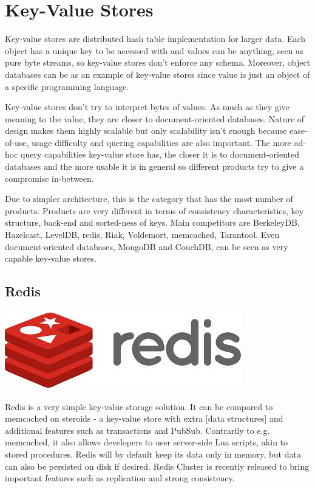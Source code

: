 \section{Key-Value Stores}

Key-value stores are distributed hash table implementation for larger data.
Each object has a unique key to be accessed with and values can be anything, seen as pure byte streams, so key-value stores don't enforce any schema.
Moreover, object databases can be as an example of key-value stores since value is just an object of a specific programming language.

Key-value stores don't try to interpret bytes of values.
As much as they give meaning to the value, they are closer to document-oriented databases.
Nature of design makes them highly scalable but only scalability isn't enough because ease-of-use, usage difficulty and quering capabilities are also important.
The more ad-hoc query capabilities key-value store has, the closer it is to document-oriented databases and the more usable it is in general so different products try to give a compromise in-between.

Due to simpler architecture, this is the category that has the most number of products.
Products are very different in terms of consistency characteristics, key structure, back-end and sorted-ness of keys. Main competitors are BerkeleyDB, Hazelcast, LevelDB, redis, Riak, Voldemort, memcached, Tarantool. Even document-oriented databases, MongoDB and CouchDB, can be seen as very capable key-value stores.

\subsection{Redis}

\vspace{-1.15cm} \hspace{3cm} \includegraphics[scale=0.2]{3/figures/redis.jpg}

Redis is a very simple key-value storage solution. It can be compared to memcached on steroids - a key-value store with extra [data structures] and additional features such as transactions and PubSub. Contrarily to e.g. memcached, it also allows developers to user server-side Lua scripts, akin to stored procedures. Redis will by default keep its data only in memory, but data can also be persisted on disk if desired. Redis Cluster is recently released to bring important features such as replication and strong consistency.

